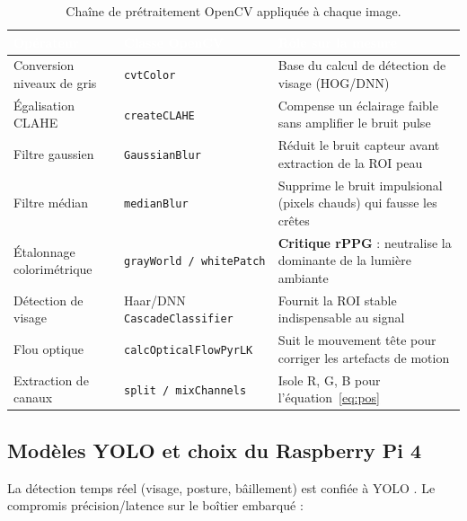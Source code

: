 \documentclass[11pt,a4paper]{article}
\begin{document}
\begin{table}[H]
\centering\small
\begin{tabularx}{\linewidth}{p{4.2cm} p{3.4cm} X}
\toprule
\rowcolor{cwblue} \textcolor{white}{\bf Opérateur} & \textcolor{white}{\bf Classe OpenCV} &
\textcolor{white}{\bf Rôle sur la mesure} \\
\midrule
Conversion niveaux de gris & \texttt{cvtColor} & Base du calcul de détection de visage (HOG/DNN) \\
Égalisation CLAHE & \texttt{createCLAHE} & Compense un éclairage faible sans amplifier le bruit pulse \\
Filtre gaussien & \texttt{GaussianBlur} & Réduit le bruit capteur avant extraction de la ROI peau \\
Filtre médian & \texttt{medianBlur} & Supprime le bruit impulsional (pixels chauds) qui fausse les crêtes \\
Étalonnage colorimétrique & \texttt{grayWorld / whitePatch} & \textbf{Critique rPPG} : neutralise la
 dominante de la lumière ambiante \\
Détection de visage & Haar/DNN \texttt{CascadeClassifier} & Fournit la ROI stable indispensable au signal \\
Flou optique & \texttt{calcOpticalFlowPyrLK} & Suit le mouvement tête pour corriger les artefacts de motion \\
Extraction de canaux & \texttt{split / mixChannels} & Isole R, G, B pour l'équation~\eqref{eq:pos} \\
\bottomrule
\end{tabularx}
\caption{Chaîne de prétraitement OpenCV appliquée à chaque image.}
\label{tab:opencv}
\end{table}

\subsection{Modèles YOLO et choix du Raspberry Pi 4}
La détection temps réel (visage, posture, bâillement) est confiée à YOLO \cite{redmon2016,
ultralytics2024}. Le compromis précision/latence sur le boîtier embarqué :
\end{document}
